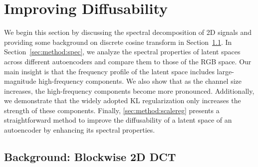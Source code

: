 


\section{Improving Diffusability}
\label{sec:method}

We begin this section by discussing the spectral decomposition of 2D signals and providing some background on discrete cosine transform in Section~\ref{sec:method:dct}.
In Section~\ref{sec:method:spec}, we analyze the spectral properties of latent spaces across different autoencoders and compare them to those of the RGB space.
Our main insight is that the frequency profile of the latent space includes large-magnitude high-frequency components.
We also show that as the channel size increases, the high-frequency components become more pronounced.
Additionally, we demonstrate that the widely adopted KL regularization only increases the strength of these components.
Finally, \cref{sec:method:scalereg} presents a straightforward method to improve the diffusability of a latent space of an autoencoder by enhancing its spectral properties.

\subsection{Background: Blockwise 2D DCT}
\label{sec:method:dct}


